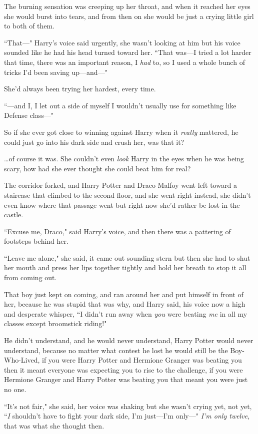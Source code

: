 The burning sensation was creeping up her throat, and when it reached her eyes she would burst into tears, and from then on she would be just a crying little girl to both of them.

``That---" Harry's voice said urgently, she wasn't looking at him but his voice sounded like he had his head turned toward her. ``That was---I tried a lot harder that time, there was an important reason, I \emph{had} to, so I used a whole bunch of tricks I'd been saving up---and---"

She'd always been trying her hardest, every time.

``---and I, I let out a side of myself I wouldn't usually use for something like Defense class---"

So if she ever got close to winning against Harry when it \emph{really} mattered, he could just go into his dark side and crush her, was that it?

{\ldots}of course it was. She couldn't even \emph{look} Harry in the eyes when he was being scary, how had she ever thought she could beat him for real?

The corridor forked, and Harry Potter and Draco Malfoy went left toward a staircase that climbed to the second floor, and she went right instead, she didn't even know where that passage went but right now she'd rather be lost in the castle.

``Excuse me, Draco," said Harry's voice, and then there was a pattering of footsteps behind her.

``Leave me alone," she said, it came out sounding stern but then she had to shut her mouth and press her lips together tightly and hold her breath to stop it all from coming out.

That boy just kept on coming, and ran around her and put himself in front of her, because he was stupid that was why, and Harry said, his voice now a high and desperate whisper, ``I didn't run away when \emph{you} were beating \emph{me} in all my classes except broomstick riding!"

He didn't understand, and he would never understand, Harry Potter would never understand, because no matter what contest he lost he would still be the Boy-Who-Lived, if you were Harry Potter and Hermione Granger was beating you then it meant everyone was expecting you to rise to the challenge, if you were Hermione Granger and Harry Potter was beating you that meant you were just no one.

``It's not fair," she said, her voice was shaking but she wasn't crying yet, not yet, ``\emph{I} shouldn't have to fight your dark side, I'm just---I'm only---" \emph{I'm only twelve,} that was what she thought then.

